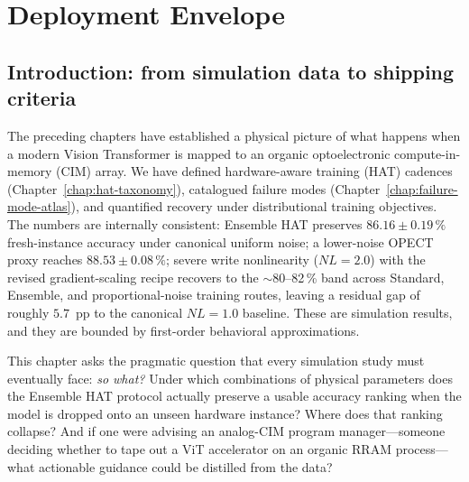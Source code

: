 
\chapter{Deployment Envelope}
\label{chap:deployment-envelope}

\section{Introduction: from simulation data to shipping criteria}

The preceding chapters have established a physical picture of what happens when a modern Vision Transformer is mapped to an organic optoelectronic compute-in-memory (CIM) array.  We have defined hardware-aware training (HAT) cadences (Chapter~\ref{chap:hat-taxonomy}), catalogued failure modes (Chapter~\ref{chap:failure-mode-atlas}), and quantified recovery under distributional training objectives.  The numbers are internally consistent: Ensemble HAT preserves $86.16\pm0.19\,\%$ fresh-instance accuracy under canonical uniform noise; a lower-noise OPECT proxy reaches $88.53\pm0.08\,\%$; severe write nonlinearity ($NL=2.0$) with the revised gradient-scaling recipe recovers to the $\sim$80--82\,\% band across Standard, Ensemble, and proportional-noise training routes, leaving a residual gap of roughly $5.7$~pp to the canonical $NL=1.0$ baseline.  These are simulation results, and they are bounded by first-order behavioral approximations.

This chapter asks the pragmatic question that every simulation study must eventually face: \emph{so what?}  Under which combinations of physical parameters does the Ensemble HAT protocol actually preserve a usable accuracy ranking when the model is dropped onto an unseen hardware instance?  Where does that ranking collapse?  And if one were advising an analog-CIM program manager---someone deciding whether to tape out a ViT accelerator on an organic RRAM process---what actionable guidance could be distilled from the data?

